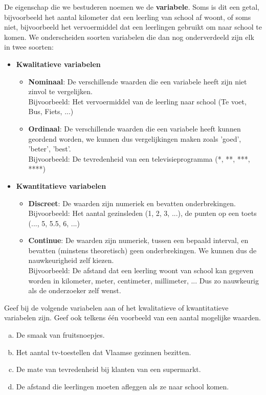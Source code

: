 \documentclass[12pt,twoside]{article}
\begin{document}
De eigenschap die we bestuderen noemen we de {\bf variabele}. Soms is dit een getal, bijvoorbeeld het aantal kilometer dat een leerling van school af woont, of soms niet, bijvoorbeeld het vervoermiddel dat een leerlingen gebruikt om naar school te komen. We onderscheiden soorten variabelen die dan nog onderverdeeld zijn elk in twee soorten:
\begin{itemize}
  \item {\bf Kwalitatieve variabelen}
  \begin{itemize}
    \item {\bf Nominaal}: De verschillende waarden die een variabele heeft zijn niet zinvol te vergelijken.\\
    Bijvoorbeeld: Het vervoermiddel van de leerling naar school (Te voet, Bus, Fiets, ...)
    \item {\bf Ordinaal}: De verschillende waarden die een variabele heeft kunnen geordend worden, we kunnen dus vergelijkingen maken zoals 'goed', 'beter', 'best'.\\
    Bijvoorbeeld: De tevredenheid van een televisieprogramma (*, **, ***, ****)
  \end{itemize}
  \item {\bf Kwantitatieve variabelen}
  \begin{itemize}
    \item {\bf Discreet}: De waarden zijn numeriek en bevatten onderbrekingen.\\
    Bijvoorbeeld: Het aantal gezinsleden (1, 2, 3, ...), de punten op een toets (..., 5, 5.5, 6, ...)
    \item {\bf Continue}: De waarden zijn numeriek, tussen een bepaald interval, en bevatten (minstens theoretisch) geen onderbrekingen. We kunnen dus de nauwkeurigheid zelf kiezen.\\
    Bijvoorbeeld: De afstand dat een leerling woont van school kan gegeven worden in kilometer, meter, centimeter, millimeter, ... Dus zo nauwkeurig als de onderzoeker zelf wenst.
  \end{itemize}
\end{itemize}

\begin{oefening}
Geef bij de volgende variabelen aan of het kwalitatieve of kwantitatieve variabelen zijn. Geef ook telkens één voorbeeld van een aantal mogelijke waarden.

\begin{enumerate}[(a)]
\item De smaak van fruitsnoepjes.
\item Het aantal tv-toestellen dat Vlaamse gezinnen bezitten.
\item De mate van tevredenheid bij klanten van een supermarkt.
\item De afstand die leerlingen moeten afleggen als ze naar school komen.
\end{enumerate}
\end{oefening}
\end{document}
